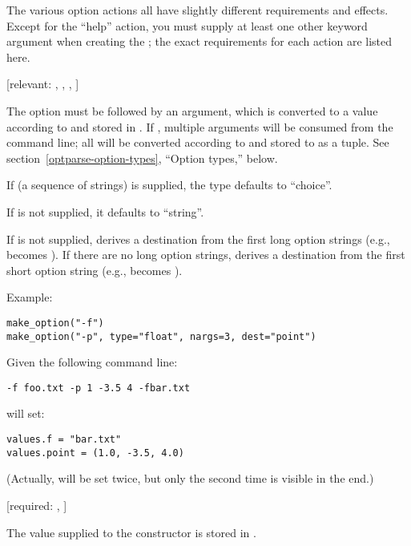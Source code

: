 The various option actions all have slightly different requirements
and effects.  Except for the ``help'' action, you must supply at least
one other keyword argument when creating the ; the exact
requirements for each action are listed here.

\begin{definitions}
 [relevant: , , , ]

The option must be followed by an argument, which is converted to a
value according to  and stored in .  If
, multiple arguments will be consumed from the command
line; all will be converted according to  and stored to
 as a tuple.  See section~\ref{optparse-option-types},
``Option types,'' below.

If  (a sequence of strings) is supplied, the type
defaults to ``choice''.

If  is not supplied, it defaults to ``string''.

If  is not supplied,  derives a
destination from the first long option strings (e.g.,
 becomes ).  If there are no long
option strings,  derives a destination from the first
short option string (e.g.,  becomes ).

Example:

\begin{verbatim}
make_option("-f")
make_option("-p", type="float", nargs=3, dest="point")
\end{verbatim}

Given the following command line:

\begin{verbatim}
-f foo.txt -p 1 -3.5 4 -fbar.txt
\end{verbatim}

 will set:

\begin{verbatim}
values.f = "bar.txt"
values.point = (1.0, -3.5, 4.0)
\end{verbatim}

(Actually,  will be set twice, but only the second
time is visible in the end.)

 [required: , ]

The  value supplied to the  constructor is
stored in .


\end{definitions}
